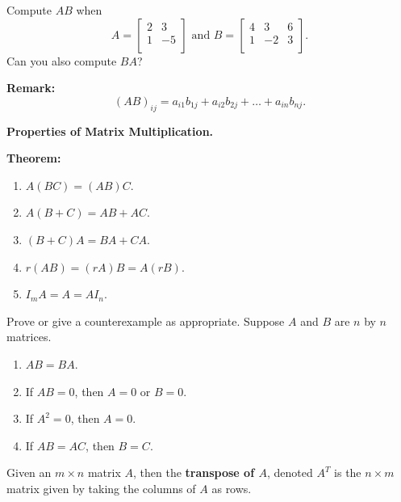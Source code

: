 \documentclass[12pt,letterpaper]{article}
\begin{document}
\begin{enumerate}

\Problem Compute $AB$ when $$A=\begin{bmatrix} 2 & 3\\ 1 & -5\\ \end{bmatrix} \text{ and } B=\begin{bmatrix} 4 & 3 & 6\\ 1 & -2 & 3\\ \end{bmatrix}.$$ Can you also compute $BA$?

\newpage


{\bf Remark:}
$$(AB)_{ij}=a_{i1}b_{1j}+a_{i2}b_{2j}+\dots+a_{in}b_{nj}.$$

{\bf Properties of Matrix Multiplication.}

{\bf Theorem:}
\begin{enumerate}
\item $A(BC)=(AB)C$.
\item $A(B+C)=AB+AC$.
\item $(B+C)A=BA+CA$.
\item $r(AB)=(rA)B=A(rB)$.
\item $I_m A =A = AI_n$.
\end{enumerate}

 Prove or give a counterexample as appropriate. Suppose $A$ and $B$ are $n$ by $n$ matrices.

\begin{enumerate}
\item $AB=BA$.

\vfill

\item If $AB=0$, then $A=0$ or $B=0$.

\vfill

\item If $A^2=0$, then $A=0$.

\vfill

\item If $AB=AC$, then $B=C$.

\vfill

\end{enumerate}

\newpage


\begin{defn}
Given an $m\times n$ matrix $A$, then the {\bf transpose of $A$}, denoted $A^{T}$ is the $n \times m$ matrix given by taking the columns of $A$ as rows.
\end{defn}


\end{enumerate}
\end{document}
